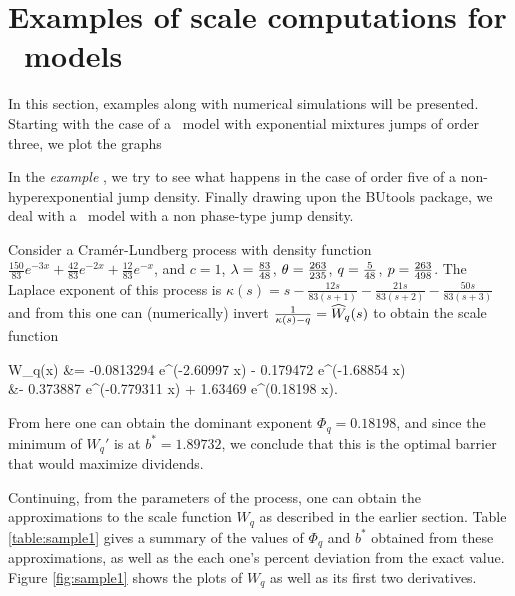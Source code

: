 \section{Examples of scale computations for \CL \ models }

In this section, examples along with numerical simulations will be presented. Starting with the case of a \CL\ model with exponential mixtures jumps of order three, we plot the graphs 


In the \textit{example }, we try to see what happens in the case of order five of a non-hyperexponential jump density. Finally drawing upon the BUtools package, we deal with a \CL\ model with a non phase-type jump density.


\beXa
Consider a Cram\'{e}r-Lundberg process with density function
$\frac{150}{83} e^{-3 x}+ \frac{42}{83} e^{-2 x} + \frac{12 }{83} e^{-x}$, and $c=1$,  $\lambda=\frac{83}{48}$, $\theta=\frac{263}{235}$, $q=\frac{5}{48}$, $p= \frac{263}{498}$.
The Laplace exponent of this process is
$\kappa(s) = s - \frac{12 s}{83 (s+1)}-\frac{21 s}{83 (s+2)}-\frac{50 s}{83 (s+3)}$ and from this one can (numerically) invert $\frac{1}{\kappa(s) - q} =  \widehat{W}_q(s)$ to obtain the scale function

\bea
W_q(x)  &= -0.0813294 e^{(-2.60997 x)} - 0.179472 e^{(-1.68854 x)} \\ &- 0.373887 e^{(-0.779311 x)}  + 1.63469 e^{(0.18198 x)}.
\eea


From here one can obtain the dominant exponent $\Phi_q = 0.18198$, and since the minimum of $W_q'$ is at $b^*=1.89732$, we conclude that this is the optimal barrier that would maximize dividends.

Continuing, from the parameters of the process, one can obtain the approximations to the scale function $W_q$ as described in the earlier section. Table \ref{table:sample1} gives a summary of the values of $\Phi_q$ and $b^*$ obtained from these approximations, as well as the each one's percent deviation from the exact value. Figure \ref{fig:sample1} shows the plots of $W_q$ as well as its first two derivatives.

